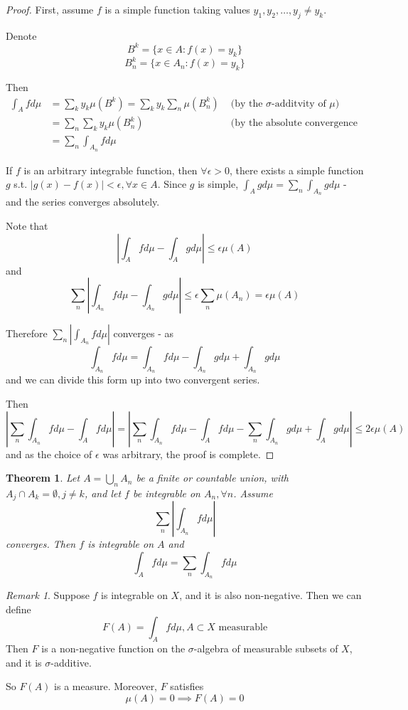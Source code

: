 \documentclass[11pt,a4paper]{report}
\theoremstyle{plain}
\newtheorem{thm}{Theorem}[section]
\theoremstyle{definition}
\theoremstyle{remark}
\newtheorem*{rem}{Remark}
\newcommand{\intersection}{\cap}
\newcommand{\Union}{\bigcup}
\newcommand{\abs}[1]{\left| #1 \right|}
\begin{document}
\begin{proof}
    First, assume $f$ is a simple function taking values $y_1, y_2, \dots, y_j \ne y_k$.

    Denote 
    $$B^k = \{ x \in A : f(x) = y_k \}$$ 
    $$B_n^k = \{ x \in A_n : f(x) = y_k \}$$

    Then 
    \begin{align*}
        \int_A f d\mu &= \sum_k y_k \mu(B^k) = \sum_k y_k \sum_n \mu(B_n^k) &\text{ (by the $\sigma$-additvity of $\mu$)} \\
                      &= \sum_n \sum_k y_k \mu(B_n^k) &\text{ (by the absolute convergence of the series)} \\
                      &= \sum_n \int_{A_n} f d\mu
    \end{align*}

    If $f$ is an arbitrary integrable function, then $\forall \epsilon > 0$, there exists a simple function $g$ s.t. $\abs{g(x) - f(x)} < \epsilon, \forall x \in A$. Since $g$ is simple, $\int_A g d\mu = \sum_n \int_{A_n} g d\mu$ - and the series converges absolutely.

    Note that 
    $$\abs{\int_A f d\mu - \int_A g d\mu} \le \epsilon\mu(A)$$
    and
    $$ \sum_n \abs{\int_{A_n} f d\mu - \int_{A_n} g d\mu} \le \epsilon\sum_n \mu(A_n) = \epsilon\mu(A) $$

    Therefore $\sum_n \abs{\int_{A_n} f d\mu}$ converges - as 
    $$ \int_{A_n} f d\mu = \int_{A_n} f d\mu - \int_{A_n} g d\mu + \int_{A_n} g d\mu $$
    and we can divide this form up into two convergent series.

    Then
    $$ \abs{\sum_n \int_{A_n} f d\mu - \int_A f d\mu} = \abs{\sum_n \int_{A_n} f d\mu - \int_A f d\mu - \sum_n \int_{A_n} g d\mu + \int_A g d\mu} \le 2 \epsilon\mu(A) $$
    and as the choice of $\epsilon$ was arbitrary, the proof is complete.
\end{proof}

\begin{thm}
    Let $A = \Union_n A_n$ be a finite or countable union, with $A_j \intersection A_k = \emptyset, j \ne k$, and let $f$ be integrable on $A_n, \forall n$. Assume
    $$ \sum_n \abs{\int_{A_n} f d\mu} $$
    converges. Then $f$ is integrable on $A$ and
    $$ \int_A f d\mu = \sum_n \int_{A_n} f d\mu $$
\end{thm}

\begin{rem}
    Suppose $f$ is integrable on $X$, and it is also non-negative. Then we can define
    $$ F(A) = \int_A f d\mu, A \subset X \text{ measurable} $$
    Then $F$ is a non-negative function on the $\sigma$-algebra of measurable subsets of $X$, and it is $\sigma$-additive.

    So $F(A)$ is a measure. Moreover, $F$ satisfies
    $$ \mu(A) = 0 \implies F(A) = 0 $$
\end{rem}
\end{document}
